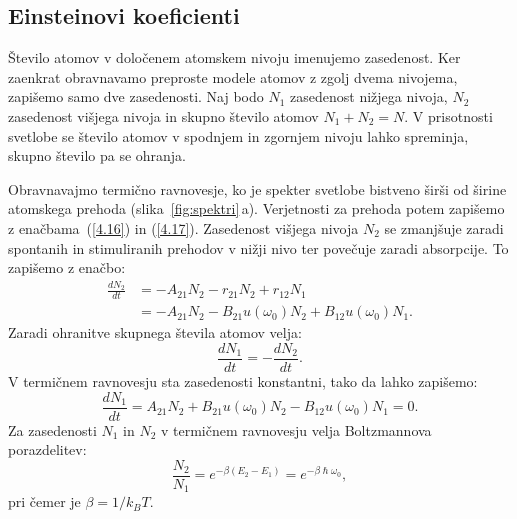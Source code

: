 \subsection*{Einsteinovi koeficienti}
\label{AB}
Število atomov v določenem atomskem nivoju imenujemo 
zasedenost. 
Ker zaenkrat obravnavamo preproste modele atomov z zgolj 
dvema nivojema, zapišemo samo dve zasedenosti. Naj bodo $N_1$ zasedenost 
nižjega nivoja, $N_{2}$ zasedenost višjega nivoja in skupno število atomov 
$N_1+N_2=N$. V prisotnosti svetlobe se število atomov v spodnjem in zgornjem 
nivoju lahko spreminja, skupno število pa se ohranja.

Obravnavajmo termično ravnovesje, ko je spekter svetlobe bistveno širši
od širine atomskega prehoda (slika~\ref{fig:spektri}\,a). Verjetnosti za prehoda potem
zapišemo z enačbama~(\ref{4.16}) in (\ref{4.17}). Zasedenost višjega nivoja $N_2$
se zmanjšuje zaradi spontanih in stimuliranih prehodov v nižji nivo ter
povečuje zaradi absorpcije. To zapišemo z enačbo:
\begin{align}
\frac{dN_{2}}{dt} &= -A_{21}N_2 - r_{21}N_2 + r_{12}N_1 \nonumber \\ 
&= -A_{21}N_{2}-B_{21}u(\omega_{0})N_{2}+B_{12}u(\omega_{0})N_{1}.
\label{4.22}
\end{align}
Zaradi ohranitve skupnega števila atomov velja:
\begin{equation}
\frac{dN_{1}}{dt}=-\frac{dN_{2}}{dt}.
\end{equation}
V termičnem ravnovesju sta zasedenosti konstantni, tako da lahko zapišemo:
\begin{equation}
\frac{dN_{1}}{dt}=A_{21}N_{2}+B_{21}u(\omega_{0})N_{2}-B_{12}u(\omega_{0})N_{1}=0.
\label{4.23}
\end{equation}
Za zasedenosti $N_{1}$ in $N_{2}$ v termičnem ravnovesju velja
Boltzmannova porazdelitev:
\begin{equation}
\frac{N_{2}}{N_{1}}=e^{-\beta(E_{2}-E_{1})} = e^{-\beta \hslash \omega_0},
\label{4.25}
\end{equation}
pri čemer je $\beta=1/k_BT$. 

